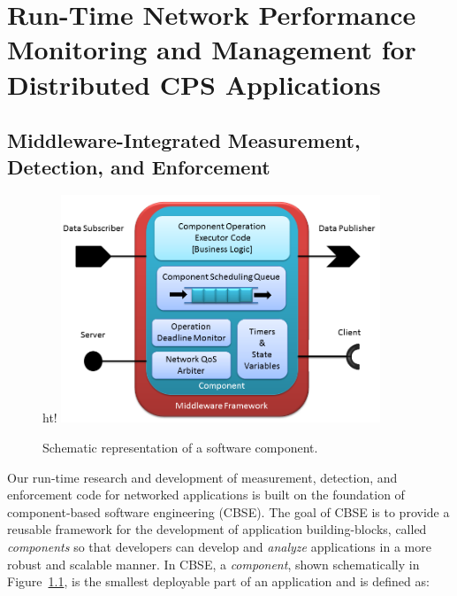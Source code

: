 \chapter{Run-Time Network Performance Monitoring and Management for Distributed CPS Applications}
\label{ch:runTime}

\section{Middleware-Integrated Measurement, Detection, and Enforcement}
\label{sec:middleware}

\begin{figure}{ht!}
  \centering
  \includegraphics[width=0.85\textwidth]{../doc/src/images/results/ros_component.png}
  \caption{Schematic representation of a software component.}
  \label{fig:component}
\end{figure}

Our run-time research and development of measurement, detection, and
enforcement code for networked applications is built on the foundation
of component-based software engineering (CBSE).  The goal of CBSE is
to provide a reusable framework for the development of application
building-blocks, called \emph{components} so that developers can develop
and \emph{analyze} applications in a more robust and scalable manner.  In
CBSE, a \emph{component}, shown schematically in
Figure~\ref{fig:component}, is the smallest deployable part of an
application and is defined as:

